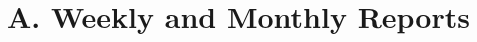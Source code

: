 \documentclass[12pt,a4paper]{report}
\begin{document}
\section*{A. Weekly and Monthly Reports}

\end{document}
